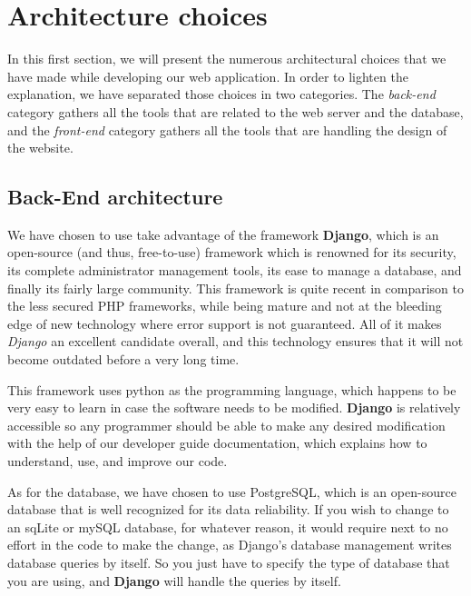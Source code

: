 \section{Architecture choices}
\label{sec:Architecture choices}


In this first section, we will present the numerous architectural choices that
we have made while developing our web application. In order to lighten the
explanation, we have separated those choices in two categories. The
\textit{back-end} category gathers all the tools that are related
to the web server and the database, and the \textit{front-end} category gathers
all the tools that are handling the design of the website.

\subsection{Back-End architecture}

We have chosen to use take advantage of the framework \textbf{Django}, which is
an open-source (and thus, free-to-use) framework which is renowned for its
security, its complete administrator management tools, its ease to manage a
database, and finally its fairly large community. This framework is quite
recent in comparison to the less secured PHP frameworks, while being mature and
not at the bleeding edge of new technology where error support is not
guaranteed. All of it makes \textit{Django} an excellent candidate overall, and
this technology ensures that it will not become outdated before a very long
time.\newline

This framework uses python as the programming language, which happens to be
very easy to learn in case the software needs to be modified. \textbf{Django}
is relatively accessible so any programmer should be able to make any desired
modification with the help of our developer guide documentation, which explains
how to understand, use, and improve our code.\newline

As for the database, we have chosen to use PostgreSQL, which is an open-source
database that is well recognized for its data reliability. If you wish to
change to an sqLite or mySQL database, for whatever reason, it would require
next to no effort in the code to make the change, as Django's database
management writes database queries by itself. So you just have to specify the
type of database that you are using, and \textbf{Django} will handle the
queries by itself.\newline

